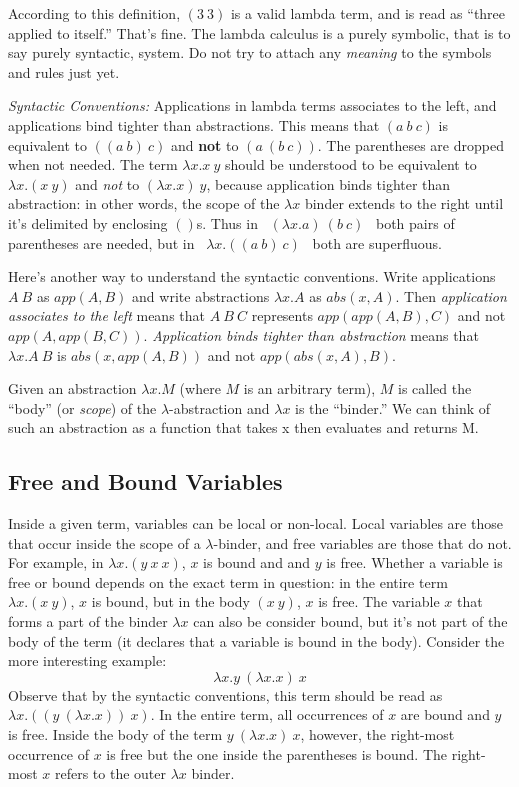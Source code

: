 According to this definition, $(3~3)$ is a valid lambda term, and is read as
``three applied to itself.''  That's fine.  The lambda calculus is a purely
symbolic, that is to say purely syntactic, system.  Do not try to attach any
{\em meaning\/} to the symbols and rules just yet. 

{\em Syntactic Conventions:}  Applications in lambda terms associates to the
left, and applications bind tighter than abstractions.  This means that
$(a~b~c)$ is equivalent to $((a~b)~c)$ and {\bf not} to $(a~(b~c))$. The parentheses
are dropped when not needed.  The term $\lambda x.x ~y$ should be understood to be
equivalent to $\lambda x.(x~y)$ and {\em not\/} to $(\lambda x.x)~y$, because
application binds tighter than abstraction: in other words, the scope of the
$\lambda x$ binder extends to the right until it's delimited
by enclosing $()$s.  Thus in \ $(\lambda x.a)~(b~c)$ \ both pairs of
parentheses are needed, but in \ $\lambda x.((a~ b)~c)$ \ both are
superfluous.

Here's another way to understand the syntactic conventions.  Write
applications $A~B$ as $app(A,B)$ and write abstractions $\lambda x.A$
as $abs(x,A)$.  Then {\em application associates to the left\/} means
that $A~B~C$ represents $app(app(A,B),C)$ and not
$app(A,app(B,C))$. {\em Application binds tighter than abstraction\/}
means that $\lambda x.A~B$ is $abs(x,app(A,B))$ and not
$app(abs(x,A),B)$.  

Given an abstraction $\lambda x.M$ (where $M$ is an arbitrary
term), $M$ is called the ``body'' (or {\em scope\/}) of the $\lambda$-abstraction and $\lambda x$ is
the ``binder.''  We can think of such an abstraction as a function that takes x
then evaluates and returns M.  

\subsection*{Free and Bound Variables}

Inside a given term, variables can be local or non-local.  Local variables
are those that occur inside the scope of a $\lambda$-binder, and free variables
are those that do not.  For example, in $\lambda x.(y~x~x)$, $x$ is bound and
and $y$ is free.  Whether a variable is free or bound depends on the exact
term in question: in the entire term $\lambda x.(x~y)$, $x$ is bound, but
in the body $(x~y)$, $x$ is free.  The variable $x$ that forms a part of the
binder $\lambda x$ can also be consider bound, but it's not part of the
body of the term (it declares that a variable is bound in the body).
Consider the more interesting example:
$$ \lambda x. y~ (\lambda x.x)~ x $$
Observe that by the syntactic conventions, this term should be
read as $\lambda x. ((y~ (\lambda x.x))~ x) $.
In the entire term, all
occurrences of $x$ are bound and $y$ is free. Inside the body of the
term $y~ (\lambda x.x)~ x $, however, the right-most occurrence of $x$ is free
but the one inside the parentheses is bound.  The right-most $x$ 
refers to the outer $\lambda x$ binder.

